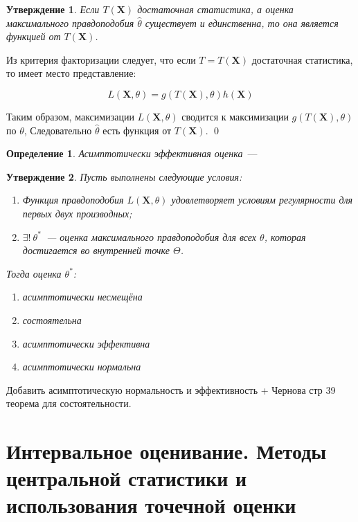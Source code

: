 \documentclass[oneside,final,14pt]{extreport}
\renewenvironment{proof}{{\bfseries Доказательство.}}{\qed}
\theoremstyle{plain}
\newtheorem*{thm*}{Утверждение}
\theoremstyle{definition}
\newtheorem*{defn}{Определение}
\theoremstyle{named}
\begin{document}
\begin{thm*}
Если $T(\mathbf{X})$ достаточная статистика, а оценка максимального правдоподобия $\hat{\theta}$ существует и единственна, то она является функцией от $T(\mathbf{X})$.
\end{thm*}

\begin{proof}
Из критерия факторизации следует, что если $T=T(\mathbf{X})$ достаточная статистика, то имеет место представление:

\begin{equation*}
    L(\mathbf{X}, \theta)=g(T(\mathbf{X}), \theta) h(\mathbf{X})
\end{equation*}

Таким образом, максимизации $L(\mathbf{X},\theta)$ сводится к максимизации $g(T(\mathbf{X}), \theta)$ по $\theta$, Следовательно $\hat{\theta}$ есть функция от $T(\mathbf{X})$.
\end{proof}

\begin{defn}
    {\it Асимптотически эффективная оценка}~---
\end{defn}

\begin{thm*}
    Пусть выполнены следующие условия:
    \begin{enumerate}
        \item Функция правдоподобия $L(\mathbf{X}, \theta)$ удовлетворяет условиям регулярности для первых двух производных;
        \item $\exists!~ \theta^{*}$~--- оценка максимального правдоподобия для всех $\theta$, которая достигается во внутренней точке $\Theta$.
    \end{enumerate}
    Тогда оценка $\theta^{*}$:
    \begin{enumerate}
        \item асимптотически несмещёна
        \item состоятельна
        \item асимптотически эффективна
        \item асимптотически нормальна
    \end{enumerate}
\end{thm*}

Добавить асимптотическую нормальность и эффективность + Чернова стр 39 теорема для состоятельности.

\section{Интервальное оценивание. Методы центральной статистики и использования точечной оценки}
\end{document}
